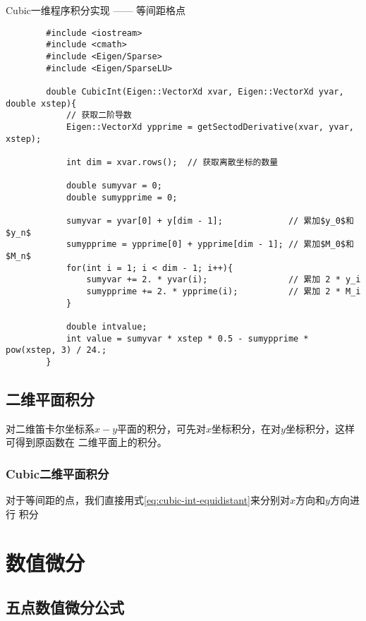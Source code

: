 \begin{example}{Cubic一维程序积分实现 —— 等间距格点}
    \begin{lstlisting}
        #include <iostream>
        #include <cmath>
        #include <Eigen/Sparse>
        #include <Eigen/SparseLU>

        double CubicInt(Eigen::VectorXd xvar, Eigen::VectorXd yvar, double xstep){
            // 获取二阶导数
            Eigen::VectorXd ypprime = getSectodDerivative(xvar, yvar, xstep);

            int dim = xvar.rows();  // 获取离散坐标的数量
            
            double sumyvar = 0;
            double sumypprime = 0;
            
            sumyvar = yvar[0] + y[dim - 1];             // 累加$y_0$和$y_n$
            sumypprime = ypprime[0] + ypprime[dim - 1]; // 累加$M_0$和$M_n$
            for(int i = 1; i < dim - 1; i++){
                sumyvar += 2. * yvar(i);                // 累加 2 * y_i
                sumypprime += 2. * ypprime(i);          // 累加 2 * M_i
            }

            double intvalue;
            int value = sumyvar * xstep * 0.5 - sumypprime * pow(xstep, 3) / 24.;
        }
    \end{lstlisting}
\end{example}

\section{二维平面积分}
对二维笛卡尔坐标系$x-y$平面的积分，可先对$x$坐标积分，在对$y$坐标积分，这样可得到原函数在
二维平面上的积分。
\subsection{Cubic二维平面积分}
对于等间距的点，我们直接用式\eqref{eq:cubic-int-equidistant}来分别对$x$方向和$y$方向进行
积分







\chapter{数值微分}
\section{五点数值微分公式}
